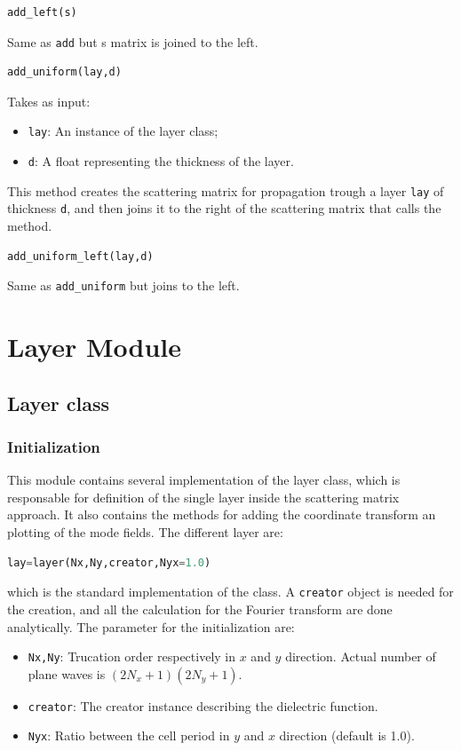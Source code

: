 \documentclass[a4paper,10pt]{report}
\begin{document}
\begin{lstlisting}[language=Python,basicstyle=\ttfamily\Large]
add_left(s)
\end{lstlisting}
Same as \texttt{add} but s matrix is joined to the left.

\begin{lstlisting}[language=Python,basicstyle=\ttfamily\Large]
add_uniform(lay,d)
\end{lstlisting}
Takes as input:
\begin{itemize}[noitemsep,topsep=0pt,parsep=0pt,partopsep=0pt]
\item \texttt{lay}: An instance of the layer class;
\item \texttt{d}: A float representing the thickness of the layer.
\end{itemize}
This method creates the scattering matrix for propagation trough a layer \texttt{lay} of thickness \texttt{d}, and then joins it to the right of the scattering matrix that calls the method.

\begin{lstlisting}[language=Python,basicstyle=\ttfamily\Large]
add_uniform_left(lay,d)
\end{lstlisting}
Same as \texttt{add\_uniform} but joins to the left.





\section{Layer Module}
\subsection{Layer class}
\subsubsection{Initialization}
This module contains several implementation of the layer class, which is responsable for definition of the single layer inside the scattering matrix approach. It also contains the methods for adding the coordinate transform an plotting of the mode fields. The different layer are:
\begin{lstlisting}[language=Python]
lay=layer(Nx,Ny,creator,Nyx=1.0)
\end{lstlisting}
which is the standard implementation of the class. A \texttt{creator} object is needed for the creation, and all the calculation for the Fourier transform are done analytically. The parameter for the initialization are:
\begin{itemize}[noitemsep,topsep=0pt,parsep=0pt,partopsep=0pt]
\item \texttt{Nx,Ny}: Trucation order respectively in $x$ and $y$ direction. Actual number of plane waves is $(2N_x+1)(2N_y+1)$.
\item \texttt{creator}: The creator instance describing the dielectric function.
\item \texttt{Nyx}: Ratio between the cell period in $y$ and $x$ direction (default is 1.0).
\end{itemize}
\end{document}
